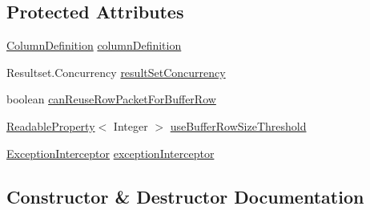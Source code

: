 \subsection*{Protected Attributes}
\begin{DoxyCompactItemize}
\item 
\mbox{\hyperlink{interfacecom_1_1mysql_1_1cj_1_1protocol_1_1_column_definition}{Column\+Definition}} \mbox{\hyperlink{classcom_1_1mysql_1_1cj_1_1protocol_1_1a_1_1_text_row_factory_a723ac4ba54ca214d91299abaa333693e}{column\+Definition}}
\item 
Resultset.\+Concurrency \mbox{\hyperlink{classcom_1_1mysql_1_1cj_1_1protocol_1_1a_1_1_text_row_factory_a7bf45e9680bd7908c812398a3206c79d}{result\+Set\+Concurrency}}
\item 
boolean \mbox{\hyperlink{classcom_1_1mysql_1_1cj_1_1protocol_1_1a_1_1_text_row_factory_ad1c4d5c8f2bab424674be72ed7a4bb21}{can\+Reuse\+Row\+Packet\+For\+Buffer\+Row}}
\item 
\mbox{\hyperlink{interfacecom_1_1mysql_1_1cj_1_1conf_1_1_readable_property}{Readable\+Property}}$<$ Integer $>$ \mbox{\hyperlink{classcom_1_1mysql_1_1cj_1_1protocol_1_1a_1_1_text_row_factory_a71885b432fc6c0822fc2ba168fb4977a}{use\+Buffer\+Row\+Size\+Threshold}}
\item 
\mbox{\hyperlink{interfacecom_1_1mysql_1_1cj_1_1exceptions_1_1_exception_interceptor}{Exception\+Interceptor}} \mbox{\hyperlink{classcom_1_1mysql_1_1cj_1_1protocol_1_1a_1_1_text_row_factory_a946b99bee4caa665f11a74d7a21af42b}{exception\+Interceptor}}
\end{DoxyCompactItemize}


\subsection{Constructor \& Destructor Documentation}
\mbox{\label{classcom_1_1mysql_1_1cj_1_1protocol_1_1a_1_1_text_row_factory_a0655493ffefb46e843346cc24bdc2db9}} 
